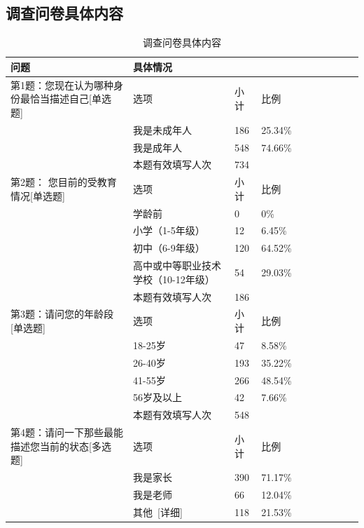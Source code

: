 \documentclass[12pt,UTF8]{ctexart}
\begin{document}
\subsection{调查问卷具体内容}
{
	\footnotesize
	\begin{spacing}{01}
		\begin{longtable}{p{3.5cm}p{2cm}p{1.5cm}p{1.5cm}p{1.5cm}p{1.5cm}p{1.5cm}p{1cm}}
			\caption{调查问卷具体内容}
			\hline
			\hline
			\bf 问题&\bf 具体情况& ~ & ~ & ~ & ~ & ~ & ~ \\
			\hline
			\hline
			第1题：您现在认为哪种身份最恰当描述自己[单选题] & 选项 & 小计 & 比例 & ~ & ~ & ~ & ~ \\ \hline
			~ & 我是未成年人 & 186 & 25.34\% & ~ & ~ & ~ & ~ \\ \hline
			~ & 我是成年人 & 548 & 74.66\% & ~ & ~ & ~ & ~ \\ \hline
			~ & 本题有效填写人次 & 734 & ~ & ~ & ~ & ~ & ~ \\ \hline
			第2题： 您目前的受教育情况[单选题] & 选项 & 小计 & 比例 & ~ & ~ & ~ & ~ \\ \hline
			~ & 学龄前 & 0 & 0\% & ~ & ~ & ~ & ~ \\ \hline
			~ & 小学（1-5年级） & 12 & 6.45\% & ~ & ~ & ~ & ~ \\ \hline
			~ & 初中（6-9年级） & 120 & 64.52\% & ~ & ~ & ~ & ~ \\ \hline
			~ & 高中或中等职业技术学校（10-12年级） & 54 & 29.03\% & ~ & ~ & ~ & ~ \\ \hline
			~ & 本题有效填写人次 & 186 & ~ & ~ & ~ & ~ & ~ \\ \hline
			第3题：请问您的年龄段[单选题] & 选项 & 小计 & 比例 & ~ & ~ & ~ & ~ \\ \hline
			~ & 18-25岁 & 47 & 8.58\% & ~ & ~ & ~ & ~ \\ \hline
			~ & 26-40岁 & 193 & 35.22\% & ~ & ~ & ~ & ~ \\ \hline
			~ & 41-55岁 & 266 & 48.54\% & ~ & ~ & ~ & ~ \\ \hline
			~ & 56岁及以上 & 42 & 7.66\% & ~ & ~ & ~ & ~ \\ \hline
			~ & 本题有效填写人次 & 548 & ~ & ~ & ~ & ~ & ~ \\ \hline
			第4题：请问一下那些最能描述您当前的状态[多选题] & 选项 & 小计 & 比例 & ~ & ~ & ~ & ~ \\ \hline
			~ & 我是家长 & 390 & 71.17\% & ~ & ~ & ~ & ~ \\ \hline
			~ & 我是老师 & 66 & 12.04\% & ~ & ~ & ~ & ~ \\ \hline
			~ & 其他 [详细] & 118 & 21.53\% & ~ & ~ & ~ & ~ \\ \hline

\end{longtable}
\end{spacing}}
\end{document}
